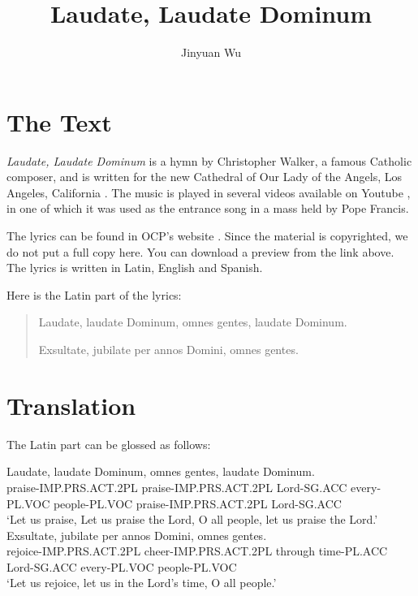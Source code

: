 \documentclass[a4paper]{article}
\title{Laudate, Laudate Dominum}
\author{Jinyuan Wu}
\begin{document}
\maketitle

\section{The Text}

\emph{Laudate, Laudate Dominum} is a hymn by Christopher Walker, a famous Catholic composer, and is written for the new Cathedral of Our Lady of the Angels, Los Angeles, California \cite{ocp-preview}.
The music is played in several videos available on Youtube \cite{youtube-1,youtube-2}, in one of which it was used as the entrance song in a mass held by Pope Francis. 

The lyrics can be found in OCP's website \cite{ocp-preview}. Since the material is copyrighted, we do not put a full copy here. You can download a preview from the link above.
The lyrics is written in Latin, English and Spanish.

Here is the Latin part of the lyrics:
\begin{quotation}
    Laudate, laudate Dominum, omnes gentes, laudate Dominum.

    Exsultate, jubilate per annos Domini, omnes gentes.
\end{quotation}

\section{Translation}

The Latin part can be glossed as follows:
\begin{exe} 
    \sn 
    \gll Laudate,               laudate                Dominum,     omnes        gentes,       laudate                Dominum. \\
         praise-IMP.PRS.ACT.2PL praise-IMP.PRS.ACT.2PL Lord-SG.ACC  every-PL.VOC people-PL.VOC praise-IMP.PRS.ACT.2PL Lord-SG.ACC \\
    \glt `Let us praise, Let us praise the Lord, O all people, let us praise the Lord.'
    \sn 
    \gll Exsultate,              jubilate                per      annos             Domini,     omnes        gentes. \\
         rejoice-IMP.PRS.ACT.2PL cheer-IMP.PRS.ACT.2PL   through  time-PL.ACC       Lord-SG.ACC every-PL.VOC people-PL.VOC \\
    \glt `Let us rejoice, let us in the Lord's time, O all people.'
\end{exe}   


 
\end{document}
